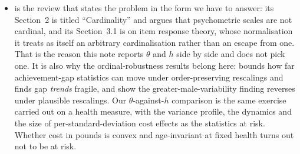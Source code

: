 \documentclass[11pt]{article}
\begin{document}
\begin{itemize}
\item \citet{cunha2021} is the review that states the problem in the form we have to answer: its Section~2 is titled ``Cardinality'' and argues that psychometric scales are not cardinal, and its Section~3.1 is on item response theory, whose normalisation it treats as itself an arbitrary cardinalisation rather than an escape from one. That is the reason this note reports $\theta$ and $h$ side by side and does not pick one. It is also why the ordinal-robustness results belong here: \citet{nielsen2015} bounds how far achievement-gap statistics can move under order-preserving rescalings and finds gap \emph{trends} fragile, and \citet{domicolo2022} show the greater-male-variability finding reverses under plausible rescalings. Our $\theta$-against-$h$ comparison is the same exercise carried out on a health measure, with the variance profile, the dynamics and the size of per-standard-deviation cost effects as the statistics at risk. Whether cost in pounds is convex and age-invariant at fixed health turns out not to be at risk.
\end{itemize}
\end{document}
